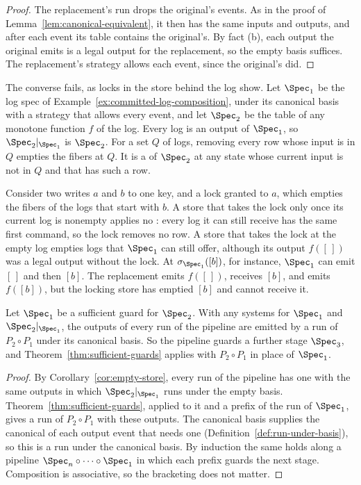 \begin{proof}
The replacement's run drops the original's \commitment events.  As in the
proof of Lemma~\ref{lem:canonical-equivalent}, it then has the same inputs and
outputs, and after each event its table contains the original's.  By fact
(b), each output the original emits is a legal output for the replacement, so
the empty basis suffices.  The replacement's strategy allows each event,
since the original's did.
\end{proof}

The converse fails, as locks in the store behind the log show.  Let
$\Spec_1$ be the log spec of Example~\ref{ex:committed-log-composition}, under
its canonical basis with a strategy that allows every event, and let
$\Spec_2$ be the table of any monotone function $f$ of the log.  Every log is
an output of $\Spec_1$, so $\Spec_2|_{\Spec_1}$ is $\Spec_2$.  For a set $Q$
of logs, removing every row whose input is in $Q$ empties the fibers at $Q$.
It is a \commitment of $\Spec_2$ at any state whose current input is not in
$Q$ and that has such a row.

Consider two writes $a$ and $b$ to one key, and a lock granted to $a$, which
empties the fibers of the logs that start with $b$.  A store that takes the
lock only once its current log is nonempty applies no \commitment: every log
it can still receive has the same first command, so the lock removes no row.
A store that takes the lock at the empty log empties logs that $\Spec_1$ can
still offer, although its output $f([\,])$ was a legal output without the
lock.  At $\sigma_{\Spec_1}([b])$, for instance, $\Spec_1$ can emit $[\,]$ and
then $[b]$.  The replacement emits $f([\,])$, receives $[b]$, and emits
$f([b])$, but the locking store has emptied $[b]$ and cannot receive it.

\begin{corollary}[Pipelines]
\label{cor:pipelines}
Let $\Spec_1$ be a sufficient guard for $\Spec_2$.  With any systems for $\Spec_1$ and
$\Spec_2|_{\Spec_1}$, the outputs of every run of the pipeline are emitted by
a run of $P_2\circ P_1$ under its canonical basis.  So the pipeline guards a
further stage $\Spec_3$, and Theorem~\ref{thm:sufficient-guards} applies
with $P_2\circ P_1$ in place of $\Spec_1$.
\end{corollary}

\begin{proof}
By Corollary~\ref{cor:empty-store}, every run of the pipeline has one with the
same outputs in which $\Spec_2|_{\Spec_1}$ runs under the empty basis.
Theorem~\ref{thm:sufficient-guards}, applied to it and a prefix of the
run of $\Spec_1$, gives a run of $P_2\circ P_1$ with these outputs.  The
canonical basis supplies the canonical \commitment of each output event that
needs one (Definition~\ref{def:run-under-basis}), so this is a run under the
canonical basis.  By induction the same holds along a pipeline
$\Spec_n\circ\cdots\circ\Spec_1$ in which each prefix guards the next
stage.  Composition is associative, so the bracketing does not matter.
\end{proof}

